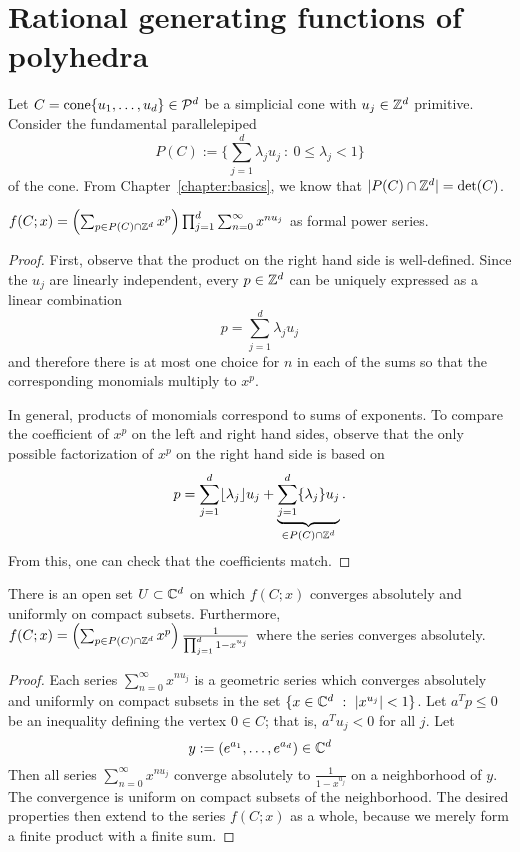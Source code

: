 \section{Rational generating functions of polyhedra}

Let $C = \operatorname{cone}\{u_1,\ldots,u_d\} \in \mathcal{P}^d$ be a simplicial cone
with $u_j \in \mathbb{Z}^d$ primitive.
Consider the fundamental parallelepiped
\[
  P(C) := \{ \sum_{j=1}^d \lambda_j u_j ~:~ 0\leq \lambda_j < 1 \}
\]
of the cone.
From Chapter~\ref{chapter:basics},
we know that $|P(C) \cap \mathbb{Z}^d| = \det(C)$.

\begin{lemma}
  \label{lemma:series-simplicial-cone}
  $f(C;x) = \left(\sum_{p \in P(C) \cap \mathbb{Z}^d} x^p \right) \prod_{j=1}^d \sum_{n=0}^\infty x^{n u_j}$
  as formal power series.
\end{lemma}
\begin{proof}
  First, observe that the product on the right hand side is well-defined.
  Since the $u_j$ are linearly independent, every $p \in \mathbb{Z}^d$ can be uniquely expressed as a linear combination
  \[
    p = \sum_{j=1}^d \lambda_j u_j
  \]
  and therefore there is at most one choice for $n$ in each of the sums
  so that the corresponding monomials multiply to $x^p$.

  In general, products of monomials correspond to sums of exponents.
  To compare the coefficient of $x^p$ on the left and right hand sides,
  observe that the only possible factorization of $x^p$ on the right hand side is based on
  \[
    p = \sum_{j=1}^d \lfloor \lambda_j \rfloor u_j + \underbrace{\sum_{j=1}^d \{ \lambda_j \} u_j}_{\in P(C) \cap \mathbb{Z}^d}.
  \]
  From this, one can check that the coefficients match.
\end{proof}


\begin{lemma}
  \label{lemma:convergence-simplicial-cone}
  There is an open set $U \subset \mathbb{C}^d$ on which $f(C;x)$ converges absolutely and uniformly on compact subsets.
  Furthermore, $f(C;x) = \left(\sum_{p \in P(C) \cap \mathbb{Z}^d} x^p \right) \frac{1}{\prod_{j=1}^d 1 - x^{u_j}}$
  where the series converges absolutely.
\end{lemma}
\begin{proof}
  Each series $\sum_{n=0}^\infty x^{n u_j}$ is a geometric series
  which converges absolutely and uniformly on compact subsets in the set $\{ x\in \mathbb{C}^d ~:~ |x^{u_j}| < 1 \}$.
  Let $a^T p \leq 0$ be an inequality defining the vertex $0 \in C$;
  that is, $a^T u_j < 0$ for all $j$.
  Let
  \[
    y := (e^{a_1}, \ldots, e^{a_d}) \in \mathbb{C}^d
  \]
  Then all series $\sum_{n=0}^\infty x^{n u_j}$ converge absolutely to $\frac{1}{1 - x^{u_j}}$ on a neighborhood of $y$.
  The convergence is uniform on compact subsets of the neighborhood.
  The desired properties then extend to the series $f(C;x)$ as a whole, because we merely form a finite product with a finite sum.
\end{proof}


